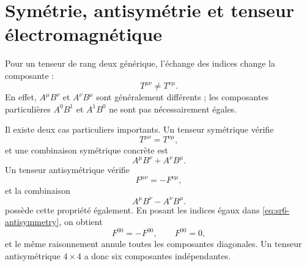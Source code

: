 \begin{classroomqa}\end{classroomqa}

\begin{classroomqa}\end{classroomqa}

\section{Symétrie, antisymétrie et tenseur électromagnétique}

Pour un tenseur de rang deux générique, l’échange des indices change la composante :
\begin{equation}
T^{\mu\nu}\neq T^{\nu\mu}.
\end{equation}
En effet, \(A^\mu B^\nu\) et \(A^\nu B^\mu\) sont généralement différents ; les composantes particulières \(A^0B^1\) et \(A^1B^0\) ne sont pas nécessairement égales.

Il existe deux cas particuliers importants. Un tenseur symétrique vérifie
\begin{equation}
T^{\mu\nu}=T^{\nu\mu},
\end{equation}
et une combinaison symétrique concrète est
\begin{equation}
A^\mu B^\nu+A^\nu B^\mu.
\end{equation}
Un tenseur antisymétrique vérifie
\begin{equation}
F^{\mu\nu}=-F^{\nu\mu},
\label{eq:sr6-antisymmetry}
\end{equation}
et la combinaison
\begin{equation}
A^\mu B^\nu-A^\nu B^\mu.
\end{equation}
possède cette propriété également. En posant les indices égaux dans \eqref{eq:sr6-antisymmetry}, on obtient
\begin{equation}
F^{00}=-F^{00},
\qquad
F^{00}=0,
\end{equation}
et le même raisonnement annule toutes les composantes diagonales. Un tenseur antisymétrique \(4\times4\) a donc six composantes indépendantes.

